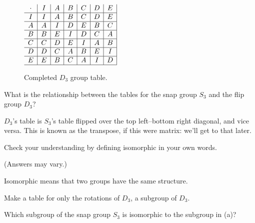 \documentclass[../gatm_answers.tex]{subfiles}
\begin{document}
\begin{figure}[h]
\centering
$\begin{array}{c|c|c|c|c|c|c|}
\cdot & I & A & B & C & D & E \\ \hline
I & I & A & B & C & D & E \\ \hline
A & A & I & D & E & B & C \\ \hline
B & B & E & I & D & C & A \\ \hline
C & C & D & E & I & A & B \\ \hline
D & D & C & A & B & E & I \\ \hline
E & E & B & C & A & I & D \\ \hline
\end{array}$
\caption{Completed $D_3$ group table.}
\label{fig:complete_sbs_table}
\end{figure}

\begin{outer_problem}
\item What is the relationship between the tables for the snap group $S_3$ and the flip group $D_3$?
\end{outer_problem}

$D_3$'s table is $S_3$'s table flipped over the top left--bottom right diagonal, and vice versa. This is known as the transpose, if this were matrix: we'll get to that later.

\begin{outer_problem}
\item Check your understanding by defining isomorphic in your own words.
\end{outer_problem}

(Answers may vary.)

Isomorphic means that two groups have the same structure.

\begin{outer_problem}
\item
\end{outer_problem}

\begin{inner_problem}[start=1]
\item Make a table for only the rotations of $D_3$, a subgroup of $D_3$.
\end{inner_problem}

\begin{inner_problem}
\item Which subgroup of the snap group $S_3$ is isomorphic to the subgroup in (a)?
\end{inner_problem}
\end{document}
